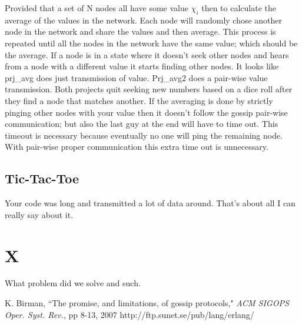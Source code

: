 \documentclass[11pt,twocolumn]{article}
\begin{document}
Provided that a set of N nodes all have some value $\chi_i$ then to calculate the average of the values in the network.  Each node will randomly chose another node in the network and share the values and then average.  This process is repeated until all the nodes in the network have the same value; which should be the average.  If a node is in a state where it doesn't seek other nodes and hears from a node with a different value it starts finding other nodes.  It looks like prj\_avg does just transmission of value.  Prj\_avg2 does a pair-wise value transmission.  Both projects quit seeking new numbers based on a dice roll after they find a node that matches another.  If the averaging is done by strictly pinging other nodes with your value then it doesn't follow the gossip pair-wise communication; but also the last guy at the end will have to time out.  This timeout is necessary because eventually no one will ping the remaining node.  With pair-wise proper communication this extra time out is unnecessary.

\subsection{Tic-Tac-Toe}

Your code was long and transmitted a lot of data around.  That's about all I can really say about it.

\section{X}

What problem did we solve and such.

\begin{thebibliography}{10}
K. Birman, ``The promise, and limitations, of gossip protocols," \emph{ACM SIGOPS Oper. Syst. Rev.}, pp 8-13, 2007
http://ftp.sunet.se/pub/lang/erlang/
\end{thebibliography}
\end{document}
